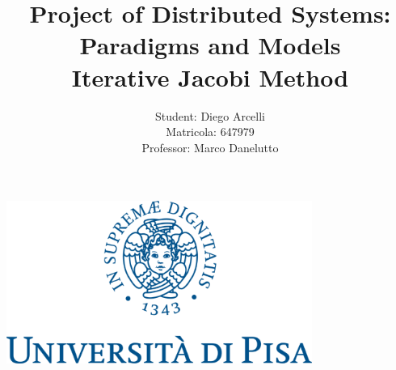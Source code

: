 \documentclass{article}
\begin{document}
	
	\begin{titlepage}
		
		\title{Project of Distributed Systems: Paradigms and Models \\
		Iterative Jacobi Method}
		\author{Student: Diego Arcelli\\ Matricola: 647979 \\
			Professor: Marco  Danelutto}
		\maketitle
		\centering
		\includegraphics[width=10cm]{./images/unipi_logo.png}
		
	\end{titlepage}
	
	\tableofcontents
	\newpage
	
\end{document}
